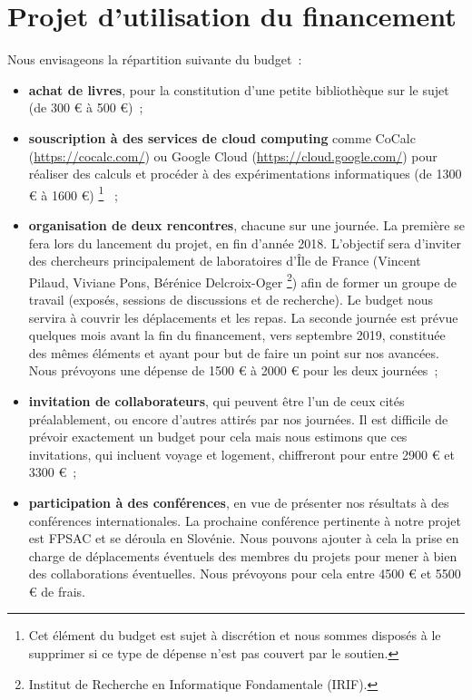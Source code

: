 \documentclass[a4paper, 10pt]{article}
\numberwithin{equation}{subsection}
\begin{document}
\vspace{-1cm}

\section*{\center Projet d'utilisation du financement}
Nous envisageons la répartition suivante du budget~:
\begin{itemize}
    \item {\bf achat de livres}, pour la constitution d'une petite
    bibliothèque sur le sujet (de 300 € à 500 €)~;

    \item {\bf souscription à des services de cloud computing} comme
    {\sc CoCalc} (\url{https://cocalc.com/}) ou {\sc Google Cloud}
    (\url{https://cloud.google.com/}) pour réaliser des calculs
    et procéder à des expérimentations informatiques (de 1300 € à 1600 €)%
    \footnote{Cet élément du budget est sujet à discrétion et nous
    sommes disposés à le supprimer si ce type de dépense n'est pas
    couvert par le soutien.}%
    ~;

    \item {\bf organisation de deux rencontres}, chacune sur une
    journée. La
    première se fera lors du lancement du projet, en fin d'année 2018.
    L'objectif sera d'inviter des chercheurs principalement de
    laboratoires d'Île de France (Vincent Pilaud, Viviane Pons,
    Bérénice Delcroix-Oger%
    \footnote{Institut de Recherche en Informatique Fondamentale
    (IRIF).})
    afin de former un groupe de travail
    (exposés, sessions de discussions et de recherche). Le budget
    nous servira à couvrir les déplacements et les repas. La
    seconde journée est prévue quelques mois avant la fin du
    financement, vers septembre 2019, constituée des mêmes éléments et
    ayant pour but de faire un point sur nos avancées. Nous
    prévoyons une dépense de 1500 € à 2000 € pour les deux journées~;

    \item {\bf invitation de collaborateurs}, qui peuvent être l'un de
    ceux cités préalablement, ou encore d'autres attirés par nos
    journées. Il est difficile de prévoir exactement un budget pour cela
    mais nous estimons que ces invitations, qui incluent voyage et
    logement, chiffreront pour entre 2900 € et 3300 €~;

    \item {\bf participation à des conférences}, en vue de présenter
    nos résultats à des conférences internationales. La prochaine
    conférence pertinente à notre projet est FPSAC
     et se déroula en Slovénie.
    Nous pouvons ajouter à cela la prise en charge de déplacements
    éventuels des membres du projets pour mener à bien des collaborations
    éventuelles.
    Nous prévoyons pour cela entre 4500 € et 5500 € de frais.
\end{itemize}
\smallbreak
\end{document}
